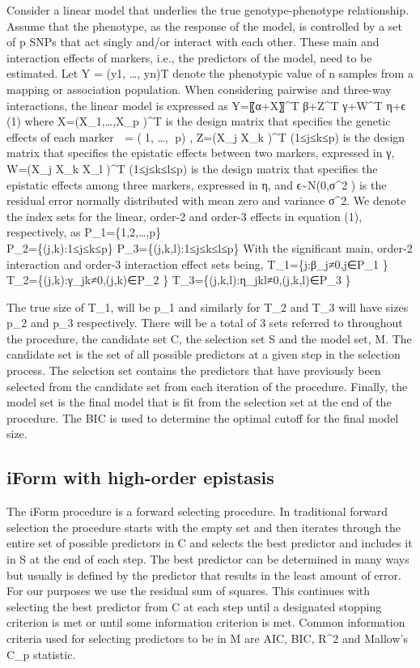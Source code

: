 \documentclass[]{book}
\theoremstyle{definition}
\theoremstyle{definition}
\theoremstyle{remark}
\begin{document}
Consider a linear model that underlies the true genotype-phenotype
relationship. Assume that the phenotype, as the response of the model,
is controlled by a set of p SNPs that act singly and/or interact with
each other. These main and interaction effects of markers, i.e., the
predictors of the model, need to be estimated. Let Y = (y1, \ldots{},
yn)T denote the phenotypic value of n samples from a mapping or
association population. When considering pairwise and three-way
interactions, the linear model is expressed as Y=〖α+X〗\^{}T β+Z\^{}T
γ+W\^{}T η+ϵ (1) where X=(X\_1,\ldots{},X\_p )\^{}T is the design matrix
that specifies the genetic effects of each marker  = (1, \ldots{}, p)
, Z=(X\_j X\_k )\^{}T (1≤j≤k≤p) is the design matrix that specifies the
epistatic effects between two markers, expressed in γ, W=(X\_j X\_k X\_l
)\^{}T (1≤j≤k≤l≤p) is the design matrix that specifies the epistatic
effects among three markers, expressed in η, and
ϵ\textasciitilde{}N(0,σ\^{}2 ) is the residual error normally
distributed with mean zero and variance σ\^{}2. We denote the index sets
for the linear, order-2 and order-3 effects in equation (1),
respectively, as P\_1=\{1,2,\ldots{},p\}\\
P\_2=\{(j,k):1≤j≤k≤p\} P\_3=\{(j,k,l):1≤j≤k≤l≤p\} With the significant
main, order-2 interaction and order-3 interaction effect sets being,
T\_1=\{j:β\_j≠0,j∈P\_1 \} T\_2=\{(j,k):γ\_jk≠0,(j,k)∈P\_2 \}
T\_3=\{(j,k,l):η\_jkl≠0,(j,k,l)∈P\_3 \}

The true size of T\_1, will be p\_1 and similarly for T\_2 and T\_3 will
have sizes p\_2 and p\_3 respectively. There will be a total of 3 sets
referred to throughout the procedure, the candidate set C, the selection
set S and the model set, M. The candidate set is the set of all possible
predictors at a given step in the selection process. The selection set
contains the predictors that have previously been selected from the
candidate set from each iteration of the procedure. Finally, the model
set is the final model that is fit from the selection set at the end of
the procedure. The BIC is used to determine the optimal cutoff for the
final model size.

\subsection{iForm with high-order
epistasis}\label{iform-with-high-order-epistasis}

The iForm procedure is a forward selecting procedure. In traditional
forward selection the procedure starts with the empty set and then
iterates through the entire set of possible predictors in C and selects
the best predictor and includes it in S at the end of each step. The
best predictor can be determined in many ways but usually is defined by
the predictor that results in the least amount of error. For our
purposes we use the residual sum of squares. This continues with
selecting the best predictor from C at each step until a designated
stopping criterion is met or until some information criterion is met.
Common information criteria used for selecting predictors to be in M are
AIC, BIC, R\^{}2 and Mallow's C\_p statistic.
\end{document}
